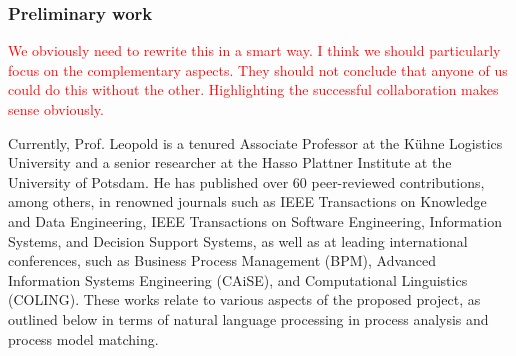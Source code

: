 \documentclass{scrartcl}
\newcommand\todo[1]{\textcolor{red}{#1}}
\begin{document}
\subsubsection{Preliminary work}

\todo{We obviously need to rewrite this in a smart way. I think we should particularly focus on the complementary aspects. They should not conclude that anyone of us could do this without the other. Highlighting the successful collaboration makes sense obviously.}

Currently, Prof. Leopold is a tenured Associate Professor at the Kühne Logistics University and a senior researcher at the Hasso Plattner Institute at the University of Potsdam. He has published over 60 peer-reviewed contributions, among others, in renowned journals such as IEEE Transactions on Knowledge and Data Engineering, IEEE Transactions on Software Engineering, Information Systems, and Decision Support Systems, as well as at leading international conferences, such as Business Process Management (BPM), Advanced Information Systems Engineering (CAiSE), and Computational Linguistics (COLING). These works relate to various aspects of the proposed project, as outlined below in terms of natural language processing in process analysis and process model matching.


\end{document}
